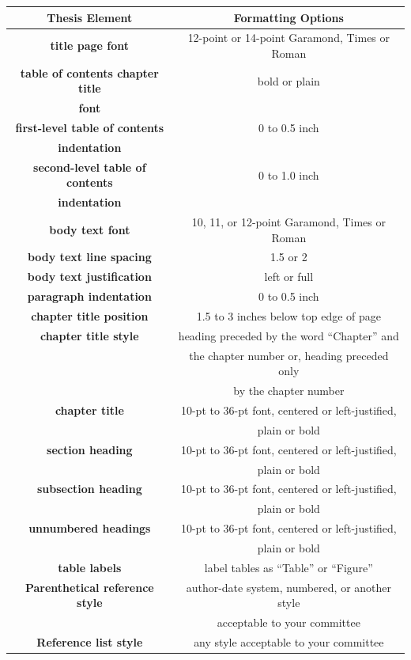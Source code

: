 \begin{table}[h]
	\begin{tabular*}{\textwidth}{|c|@{\extracolsep{\fill}}c|}
		\hline
		\textbf{Thesis Element} & \textbf{Formatting Options} \\ \hline
		\textbf{title page font} & \small 12-point or 14-point Garamond, Times or Roman \\ \hline
		\textbf{table of contents chapter title} & \small bold or plain \\
			\textbf{font} & \\ \hline
		\textbf{first-level table of contents} & \small 0 to 0.5 inch \\
			\textbf{indentation} & \\ \hline
		\textbf{second-level table of contents} & \small 0 to 1.0 inch \\
			\textbf{indentation} & \\ \hline
		\textbf{body text font} & \small 10, 11, or 12-point Garamond, Times or Roman \\ \hline
		\textbf{body text line spacing} & \small 1.5 or 2 \\ \hline
		\textbf{body text justification} & \small left or full \\ \hline
		\textbf{paragraph indentation} & \small 0 to 0.5 inch \\ \hline
		\textbf{chapter title position} & \small 1.5 to 3 inches below top edge of page \\ \hline
		\textbf{chapter title style} & \small heading preceded by the word ``Chapter'' and \\
			& \small the chapter number or, heading preceded only \\
			& \small by the chapter number \\ \hline
		\textbf{chapter title} & \small 10-pt to 36-pt font, centered or left-justified, \\
			& \small plain or bold \\ \hline
		\textbf{section heading} & \small 10-pt to 36-pt font, centered or left-justified, \\
			& \small plain or bold \\ \hline
		\textbf{subsection heading} & \small 10-pt to 36-pt font, centered or left-justified, \\
			& \small plain or bold \\ \hline
		\textbf{unnumbered headings} & \small 10-pt to 36-pt font, centered or left-justified, \\
			& \small plain or bold \\ \hline
		\textbf{table labels} & \small label tables as ``Table'' or ``Figure'' \\ \hline
		\textbf{Parenthetical reference style} & \small author-date system, numbered, or another style \\
			& \small acceptable to your committee \\ \hline
		\textbf{Reference list style} & any style acceptable to your committee \\ \hline
	\end{tabular*}
\end{table}

